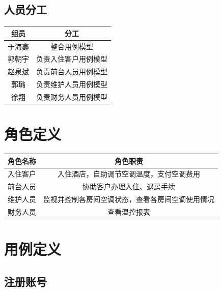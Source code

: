 \documentclass[blue,normal,cn]{elegantnote}
\begin{document}
\subsection{人员分工}

\begin{center}
    \begin{tabular}{cc}
        \toprule
        \textbf{组员} & \textbf{分工}        \\
        \midrule
        于海鑫        & 整合用例模型         \\
        郭朝宇        & 负责入住客户用例模型 \\
        赵泉斌        & 负责前台人员用例模型 \\
        郭璐          & 负责维护人员用例模型 \\
        徐翔          & 负责财务人员用例模型 \\
        \bottomrule
    \end{tabular}
\end{center}

\section{角色定义}

\begin{center}
    \begin{tabular}{cc}
        \toprule
        \textbf{角色名称} & \textbf{角色职责}                                \\
        \midrule
        入住客户          & 入住酒店，自助调节空调温度，支付空调费用         \\
        前台人员          & 协助客户办理入住、退房手续                       \\
        维护人员          & 监视并控制各房间空调状态，查看各房间空调使用情况 \\
        财务人员          & 查看温控报表                                     \\
        \bottomrule
    \end{tabular}
\end{center}

\section{用例定义}

\subsection{注册账号}
\end{document}
